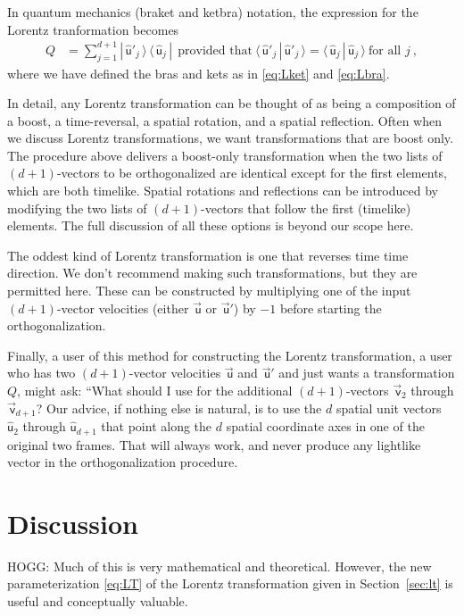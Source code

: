 \documentclass{article}
\newcommand\upvec[1]{\!\vec{\,\mathrm{#1}}}
\newcommand{\Lvec}[1]{\upvec{\mathsf{#1}}} %
\newcommand{\Lhat}[1]{\hat{\mathsf{#1}}} %
\newcommand{\braket}[2]{\langle\,{#1}\,|\,{#2}\,\rangle}
\newcommand{\ketbra}[2]{|\,{#1}\,\rangle\,\langle\,{#2}\,|}
\newcommand{\plus}{\!+\!} %
\newcommand{\secref}[1]{Section~\ref{#1}}
\begin{document}
In quantum mechanics (braket and ketbra) notation, the expression for the Lorentz tranformation becomes
\begin{align}
    Q &= \sum_{j=1}^{d+1} \ketbra{\Lhat{u}'_j}{\Lhat{u}_j} ~~ \mbox{provided that} ~ \braket{\Lhat{u}'_j}{\Lhat{u}'_j} = \braket{\Lhat{u}_j}{\Lhat{u}_j} ~ \mbox{for all $j$} ~,
\end{align}
where we have defined the bras and kets as in \eqref{eq:Lket} and \eqref{eq:Lbra}.

In detail, any Lorentz transformation can be thought of as being a composition of a boost, a time-reversal, a spatial rotation, and a spatial reflection.
Often when we discuss Lorentz transformations, we want transformations that are boost only.
The procedure above delivers a boost-only transformation when the two lists of $(d\plus1)$-vectors to be orthogonalized are identical except for the first elements, which are both timelike.
Spatial rotations and reflections can be introduced by modifying the two lists of $(d\plus1)$-vectors that follow the first (timelike) elements.
The full discussion of all these options is beyond our scope here.

The oddest kind of Lorentz transformation is one that reverses time time direction.
We don't recommend making such transformations, but they are permitted here.
These can be constructed by multiplying one of the input $(d+1)$-vector velocities (either $\Lvec{u}$ or $\Lvec{u}'$) by $-1$ before starting the orthogonalization.

Finally, a user of this method for constructing the Lorentz transformation, a user who has two $(d\plus1)$-vector velocities $\Lvec{u}$ and $\Lvec{u}'$ and just wants a transformation $Q$, might ask: ``What should I use for the additional $(d\plus1)$-vectors $\Lvec{v}_2$ through $\Lvec{v}_{d+1}$?
Our advice, if nothing else is natural, is to use the $d$ spatial unit vectors $\Lhat{u}_2$ through $\Lhat{u}_{d+1}$ that point along the $d$ spatial coordinate axes in one of the original two frames.
That will always work, and never produce any lightlike vector in the orthogonalization procedure.

\section{Discussion}\label{sec:discussion}

HOGG: Much of this is very mathematical and theoretical.
However, the new parameterization \eqref{eq:LT} of the Lorentz transformation given in \secref{sec:lt} is useful and conceptually valuable.
\end{document}
